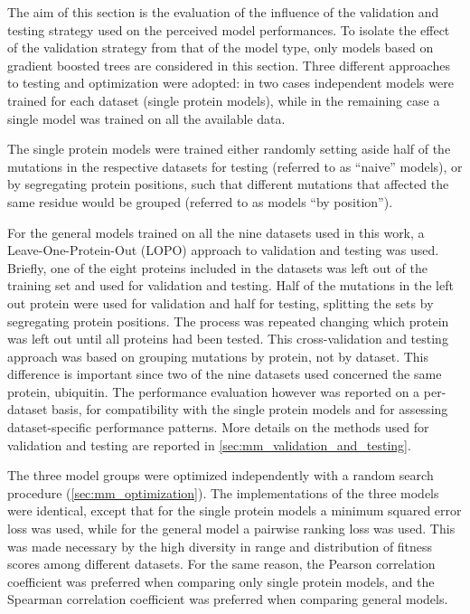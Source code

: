 The aim of this section is the evaluation of the influence of the validation and testing strategy used on the perceived model performances.
To isolate the effect of the validation strategy from that of the model type, only models based on gradient boosted trees are considered in this section.
Three different approaches to testing and optimization were adopted: in two cases independent models were trained for each dataset (single protein models), while in the remaining case a single model was trained on all the available data.

The single protein models were trained either randomly setting aside half of the mutations in the respective datasets for testing (referred to as ``naive'' models), or by segregating protein positions, such that different mutations that affected the same residue would be grouped (referred to as models ``by position'').

For the general models trained on all the nine datasets used in this work, a Leave-One-Protein-Out (LOPO) approach to validation and testing was used.
Briefly, one of the eight proteins included in the datasets was left out of the training set and used for validation and testing. Half of the mutations in the left out protein were used for validation and half for testing, splitting the sets by segregating protein positions.
The process was repeated changing which protein was left out until all proteins had been tested.
This cross-validation and testing approach was based on grouping mutations by protein, not by dataset.
This difference is important since two of the nine datasets used concerned the same protein, ubiquitin.
The performance evaluation however was reported on a per-dataset basis, for compatibility with the single protein models and for assessing dataset-specific performance patterns.
More details on the methods used for validation and testing are reported in \cref{sec:mm_validation_and_testing}.

The three model groups were optimized independently with a random search procedure (\cref{sec:mm_optimization}).
The implementations of the three models were identical, except that for the single protein models a minimum squared error loss was used, while for the general model a pairwise ranking loss was used.
This was made necessary by the high diversity in range and distribution of fitness scores among different datasets.
For the same reason, the Pearson correlation coefficient was preferred when comparing only single protein models, and the Spearman correlation coefficient was preferred when comparing general models.

